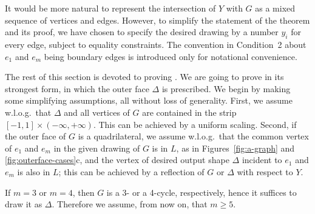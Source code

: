 It would be more natural to represent the intersection of $Y$ with $G$
as a mixed sequence of vertices and edges. However, to simplify the
statement of the theorem and its proof, we have chosen to specify the
desired drawing by a number $y_i$ for every edge, subject to equality
constraints. %
The convention in Condition~2 about $e_1$ and $e_m$ being boundary
edges is introduced only for
 notational convenience.

The rest of this section is devoted to proving . We
are going to prove  in its strongest form, in which the
outer face $\Delta$ is prescribed.  We begin by making some simplifying
assumptions, all without loss of generality.
%
%
%
First, we assume w.l.o.g.\ that $\Delta$ and all vertices of $G$
are contained in the strip $[-1,1]\times(-\infty,+\infty)$.  This can
be achieved by a uniform scaling.  Second, if the outer face of $G$
is a quadrilateral, we assume w.l.o.g.\ that the common vertex
of $e_1$ and $e_m$ in the given drawing of $G$ is in $L$, as in
Figures~\ref{fig:a-graph} and \ref{fig:outerface-cases}c, and the
vertex of desired output shape $\Delta$ incident to $e_1$ and $e_m$
is also in $L$; this can be achieved by a reflection of $G$ or $\Delta$
with respect to $Y$.



If $m=3$ or $m=4$, then $G$ is a 3- or a 4-cycle, respectively, hence it suffices to draw it as $\Delta$. Therefore we assume, from now on, that $m\ge 5$.  

